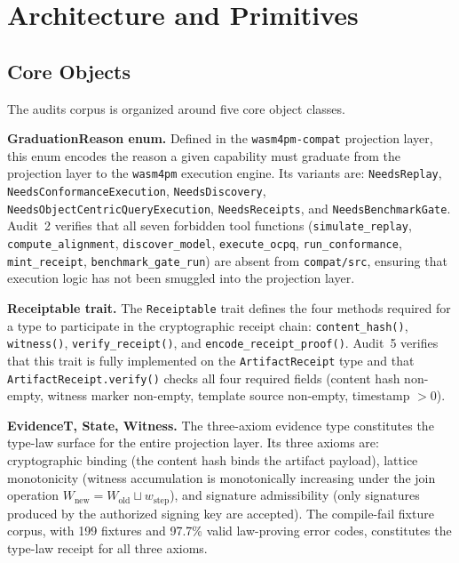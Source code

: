 
\section{Architecture and Primitives}
\label{sec:audits-arch}

\subsection{Core Objects}
\label{sec:audits-arch-objects}

The audits corpus is organized around five core object classes.

\textbf{GraduationReason enum.} Defined in the \texttt{wasm4pm-compat}
projection layer, this enum encodes the reason a given capability must graduate
from the projection layer to the \texttt{wasm4pm} execution engine. Its
variants are: \texttt{NeedsReplay}, \texttt{NeedsConformanceExecution},
\texttt{NeedsDiscovery}, \texttt{NeedsObjectCentricQueryExecution},
\texttt{NeedsReceipts}, and \texttt{NeedsBenchmarkGate}. Audit~2 verifies that
all seven forbidden tool functions (\texttt{simulate\_replay},
\texttt{compute\_alignment}, \texttt{discover\_model}, \texttt{execute\_ocpq},
\texttt{run\_conformance}, \texttt{mint\_receipt}, \texttt{benchmark\_gate\_run})
are absent from \texttt{compat/src}, ensuring that execution logic has not been
smuggled into the projection layer.

\textbf{Receiptable trait.} The \texttt{Receiptable} trait defines the four
methods required for a type to participate in the cryptographic receipt chain:
\texttt{content\_hash()}, \texttt{witness()}, \texttt{verify\_receipt()}, and
\texttt{encode\_receipt\_proof()}. Audit~5 verifies that this trait is fully
implemented on the \texttt{ArtifactReceipt} type and that \texttt{ArtifactReceipt.verify()}
checks all four required fields (content hash non-empty, witness marker
non-empty, template source non-empty, timestamp \(> 0\)).

\textbf{Evidence\textlangle T, State, Witness\textrangle.} The three-axiom
evidence type constitutes the type-law surface for the entire projection layer.
Its three axioms are: cryptographic binding (the content hash binds the artifact
payload), lattice monotonicity (witness accumulation is monotonically increasing
under the join operation \(W_{\text{new}} = W_{\text{old}} \sqcup w_{\text{step}}\)),
and signature admissibility (only signatures produced by the authorized signing
key are accepted). The compile-fail fixture corpus, with 199 fixtures and 97.7\%
valid law-proving error codes, constitutes the type-law receipt for all three
axioms.

